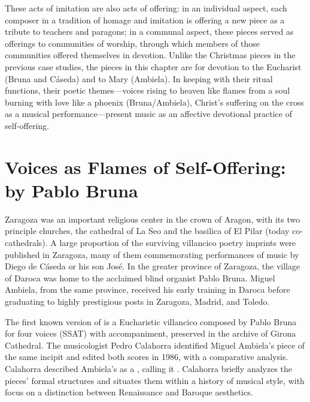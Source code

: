 These acts of imitation are also acts of offering: in an individual aspect, each
composer in a tradition of homage and imitation is offering a new piece as a
tribute to teachers and paragons; in a communal aspect, these pieces served as
offerings to communities of worship, through which members of those communities
offered themselves in devotion. 
Unlike the Christmas pieces in the previous case studies, the pieces in this
chapter are for devotion to the Eucharist (Bruna and Cáseda) and to Mary
(Ambiela).  
In keeping with their ritual functions, their poetic themes---voices rising to
heaven like flames from a soul burning with love like a phoenix (Bruna/Ambiela),
Christ's suffering on the cross as a musical performance---present music as an
affective devotional practice of self-offering.

\section{Voices as Flames of Self-Offering: 
 by Pablo Bruna}

Zaragoza was an important religious center in the crown of Aragon, with its two
principle churches, the cathedral of La Seo and the basilica of El Pilar (today
co-cathedrals).  
A large proportion of the surviving villancico poetry imprints were published in
Zaragoza, many of them commemorating performances of music by Diego de Cáseda or
his son José.
In the greater province of Zaragoza, the village of Daroca was home to the
acclaimed blind organist Pablo Bruna.  
Miguel Ambiela, from the same province, received his early training in Daroca
before graduating to highly prestigious posts in Zaragoza, Madrid, and Toledo.


The first known version of  is a Eucharistic
villancico composed by Pablo Bruna for four voices (SSAT) with accompaniment,
preserved in the archive of Girona Cathedral.%
    \citXXX[signature]
The musicologist Pedro Calahorra identified Miguel Ambiela's piece of the same
incipit and edited both scores in 1986, with a comparative analysis.
Calahorra described Ambiela's  as a , calling it .%
    \Autocite[9]{Calahorra:Suban}
Calahorra briefly analyzes the pieces' formal structures and situates them
within a history of musical style, with focus on a distinction between
Renaissance and Baroque aesthetics.


